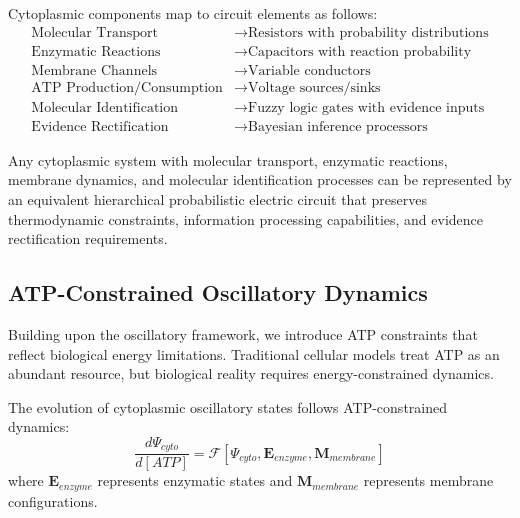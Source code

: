 \documentclass[11pt,a4paper]{article}
\begin{document}
\begin{definition}
Cytoplasmic components map to circuit elements as follows:
\begin{align}
\text{Molecular Transport} &\rightarrow \text{Resistors with probability distributions} \\
\text{Enzymatic Reactions} &\rightarrow \text{Capacitors with reaction probability} \\
\text{Membrane Channels} &\rightarrow \text{Variable conductors} \\
\text{ATP Production/Consumption} &\rightarrow \text{Voltage sources/sinks} \\
\text{Molecular Identification} &\rightarrow \text{Fuzzy logic gates with evidence inputs} \\
\text{Evidence Rectification} &\rightarrow \text{Bayesian inference processors}
\end{align}
\end{definition}

\begin{theorem}
Any cytoplasmic system with molecular transport, enzymatic reactions, membrane dynamics, and molecular identification processes can be represented by an equivalent hierarchical probabilistic electric circuit that preserves thermodynamic constraints, information processing capabilities, and evidence rectification requirements.
\end{theorem}

\subsection{ATP-Constrained Oscillatory Dynamics}

Building upon the oscillatory framework, we introduce ATP constraints that reflect biological energy limitations. Traditional cellular models treat ATP as an abundant resource, but biological reality requires energy-constrained dynamics.

\begin{definition}
The evolution of cytoplasmic oscillatory states follows ATP-constrained dynamics:
\begin{equation}
\frac{d\Psi_{cyto}}{d[ATP]} = \mathcal{F}[\Psi_{cyto}, \mathbf{E}_{enzyme}, \mathbf{M}_{membrane}]
\end{equation}
where $\mathbf{E}_{enzyme}$ represents enzymatic states and $\mathbf{M}_{membrane}$ represents membrane configurations.
\end{definition}
\end{document}
